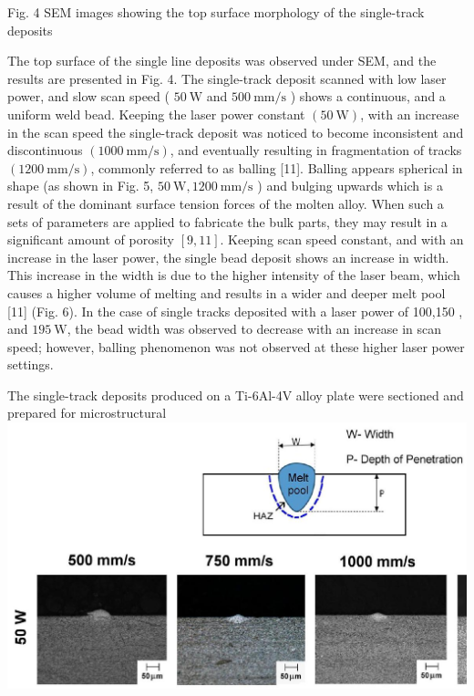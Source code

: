 \documentclass[10pt]{article}
\begin{document}
Fig. 4 SEM images showing the top surface morphology of the single-track deposits

The top surface of the single line deposits was observed under SEM, and the results are presented in Fig. 4. The single-track deposit scanned with low laser power, and slow scan speed ( $50 \mathrm{~W}$ and $500 \mathrm{~mm} / \mathrm{s}$ ) shows a continuous, and a uniform weld bead. Keeping the laser power constant $(50 \mathrm{~W})$, with an increase in the scan speed the single-track deposit was noticed to become inconsistent and discontinuous $(1000 \mathrm{~mm} / \mathrm{s})$, and eventually resulting in fragmentation of tracks $(1200 \mathrm{~mm} / \mathrm{s})$, commonly referred to as balling [11]. Balling appears spherical in shape (as shown in Fig. 5, $50 \mathrm{~W}, 1200 \mathrm{~mm} / \mathrm{s}$ ) and bulging upwards which is a result of the dominant surface tension forces of the molten alloy. When such a sets of parameters are applied to fabricate the bulk parts, they may result in a significant amount of porosity $[9,11]$. Keeping scan speed constant, and with an increase in the laser power, the single bead deposit shows an increase in width. This increase in the width is due to the higher intensity of the laser beam, which causes a higher volume of melting and results in a wider and deeper melt pool [11] (Fig. 6). In the case of single tracks deposited with a laser power of 100,150 , and $195 \mathrm{~W}$, the bead width was observed to decrease with an increase in scan speed; however, balling phenomenon was not observed at these higher laser power settings.

The single-track deposits produced on a Ti-6Al-4V alloy plate were sectioned and prepared for microstructural\\
\includegraphics[max width=\textwidth, center]{2024_02_28_5b6806184856c64a957ag-05}
\end{document}

